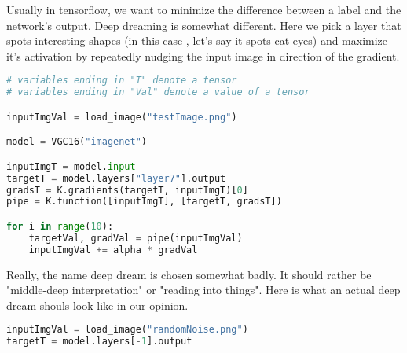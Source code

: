 Usually in tensorflow, we want to minimize the difference between a label and the network's output. Deep dreaming is somewhat different. Here we pick a layer that spots interesting shapes (in this case , let's say it spots cat-eyes) and maximize it's activation by repeatedly nudging the input image in direction of the gradient.  
\begin{lstlisting}[language=python, caption=Pseudocode]
# variables ending in "T" denote a tensor
# variables ending in "Val" denote a value of a tensor

inputImgVal = load_image("testImage.png")

model = VGC16("imagenet")

inputImgT = model.input
targetT = model.layers["layer7"].output
gradsT = K.gradients(targetT, inputImgT)[0]
pipe = K.function([inputImgT], [targetT, gradsT])

for i in range(10):
	targetVal, gradVal = pipe(inputImgVal)
	inputImgVal += alpha * gradVal
\end{lstlisting}
Really, the name deep dream is chosen somewhat badly. It should rather be "middle-deep interpretation" or "reading into things". Here is what an actual deep dream shouls look like in our opinion. 
\begin{lstlisting}[language=python]
inputImgVal = load_image("randomNoise.png")
targetT = model.layers[-1].output
\end{lstlisting}

